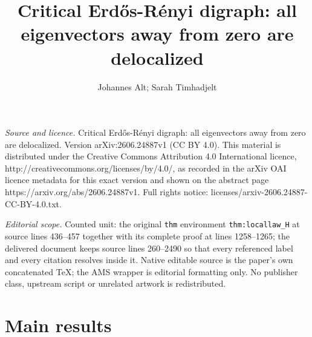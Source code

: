 \documentclass[10pt,a4paper]{amsart}
\numberwithin{equation}{section}
\begin{document}
\title[Critical ErdH os-R'enyi digraph: all eigenvectors away from ]{Critical Erd{\H o}s-R\'enyi digraph: all eigenvectors away from zero are delocalized}
\author{Johannes Alt; Sarah Timhadjelt}
\date{}
\maketitle
\noindent\emph{Source and licence.} Critical Erd{\H o}s-R\'enyi digraph: all eigenvectors away from zero are delocalized. Version arXiv:2606.24887v1 (CC BY 4.0). This material is distributed under the Creative Commons Attribution 4.0 International licence, http://creativecommons.org/licenses/by/4.0/, as recorded in the arXiv OAI licence metadata for this exact version and shown on the abstract page https://arxiv.org/abs/2606.24887v1. Full rights notice: licenses/arxiv-2606.24887-CC-BY-4.0.txt.\par\smallskip
\noindent\textit{Editorial scope.} Counted unit: the original \texttt{thm} environment \texttt{thm:locallaw\_H} at source lines 436--457 together with its complete proof at lines 1258--1265; the delivered document keeps source lines 260--2490 so that every referenced label and every citation resolves inside it. Native editable source is the paper's own concatenated TeX; the AMS wrapper is editorial formatting only. No publisher class, upstream script or unrelated artwork is redistributed.
	\section{Main results} \label{sec:main_results}
	
\end{document}
